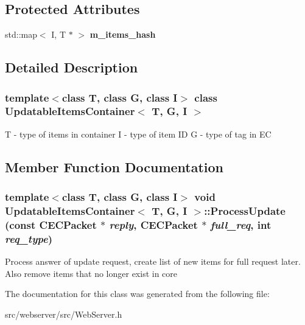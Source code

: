 \subsection*{Protected Attributes}
\begin{DoxyCompactItemize}
\item 
std::map$<$ I, T $\ast$ $>$ {\bfseries m\_\-items\_\-hash}\label{classUpdatableItemsContainer_ab60f16af6535d9a4d373e904baad47a4}

\end{DoxyCompactItemize}


\subsection{Detailed Description}
\subsubsection*{template$<$class T, class G, class I$>$ class UpdatableItemsContainer$<$ T, G, I $>$}

T -\/ type of items in container I -\/ type of item ID G -\/ type of tag in EC 

\subsection{Member Function Documentation}
\subsubsection[{ProcessUpdate}]{\setlength{\rightskip}{0pt plus 5cm}template$<$class T, class G, class I$>$ void {\bf UpdatableItemsContainer}$<$ T, G, I $>$::ProcessUpdate (const {\bf CECPacket} $\ast$ {\em reply}, \/  {\bf CECPacket} $\ast$ {\em full\_\-req}, \/  int {\em req\_\-type})\hspace{0.3cm}{\ttfamily  [inline]}}\label{classUpdatableItemsContainer_a6e1ff374b98ec161361c812ce473855b}
Process answer of update request, create list of new items for full request later. Also remove items that no longer exist in core 

The documentation for this class was generated from the following file:\begin{DoxyCompactItemize}
\item 
src/webserver/src/WebServer.h\end{DoxyCompactItemize}
